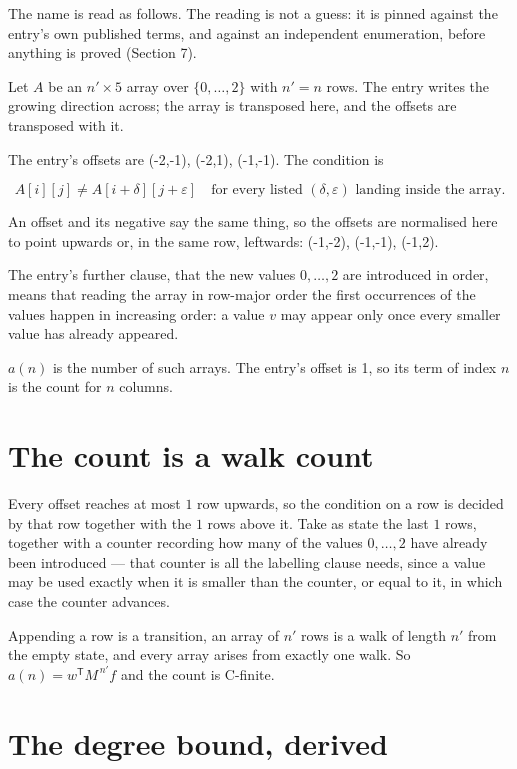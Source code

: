 \documentclass[11pt]{article}
\theoremstyle{definition}
\begin{document}
The name is read as follows. The reading is not a guess: it is pinned against the entry's own published terms, and against an independent enumeration, before anything is proved (Section 7).

Let $A$ be an $n' \times 5$ array over $\{0,\dots,2\}$ with $n' = n$ rows. The entry writes the growing direction across; the array is transposed here, and the offsets are transposed with it.

The entry's offsets are (-2,-1), (-2,1), (-1,-1). The condition is

\[A[i][j] \ne A[i{+}\delta][j{+}\varepsilon]\quad\text{for every listed }(\delta,\varepsilon)\text{ landing inside the array.}\]

An offset and its negative say the same thing, so the offsets are normalised here to point upwards or, in the same row, leftwards: (-1,-2), (-1,-1), (-1,2).

The entry's further clause, that the new values $0,\dots,2$ are introduced in order, means that reading the array in row-major order the first occurrences of the values happen in increasing order: a value $v$ may appear only once every smaller value has already appeared.

$a(n)$ is the number of such arrays. The entry's offset is 1, so its term of index $n$ is the count for $n$ columns.

\section{The count is a walk count}

Every offset reaches at most $1$ row upwards, so the condition on a row is decided by that row together with the $1$ rows above it. Take as state the last $1$ rows, together with a counter recording how many of the values $0,\dots,2$ have already been introduced --- that counter is all the labelling clause needs, since a value may be used exactly when it is smaller than the counter, or equal to it, in which case the counter advances.

Appending a row is a transition, an array of $n'$ rows is a walk of length $n'$ from the empty state, and every array arises from exactly one walk. So $a(n) = w^{\mathsf T}M^{\,n'}f$ and the count is C-finite.

\section{The degree bound, derived}
\end{document}
